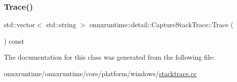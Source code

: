 \subsubsection{\texorpdfstring{Trace()}{Trace()}}
{\footnotesize\ttfamily std\+::vector$<$ std\+::string $>$ onnxruntime\+::detail\+::\+Capture\+Stack\+Trace\+::\+Trace (\begin{DoxyParamCaption}{ }\end{DoxyParamCaption}) const}



The documentation for this class was generated from the following file\+:\begin{DoxyCompactItemize}
\item 
onnxruntime/onnxruntime/core/platform/windows/\mbox{\hyperlink{windows_2stacktrace_8cc}{stacktrace.\+cc}}\end{DoxyCompactItemize}
